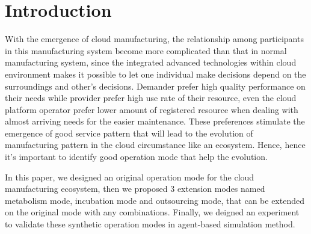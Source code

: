 \section{Introduction}
With the emergence of cloud manufacturing, the relationship among participants in this manufacturing system become more complicated than that in normal manufacturing system, since the integrated advanced technologies within cloud environment makes it possible to let one individual make decisions depend on the surroundings and other's decisions. Demander prefer high quality performance on their needs while provider prefer high use rate of their resource, even the cloud platform operator prefer lower amount of registered resource when dealing with almost arriving needs for the easier maintenance. These preferences stimulate the emergence of good service pattern that will lead to the evolution of manufacturing pattern in the cloud circumstance like an ecosystem. Hence, hence it's important to identify good operation mode that help the evolution. 

In this paper, we designed an original operation mode for the cloud manufacturing ecosystem, then we proposed 3 extension modes named metabolism mode, incubation mode and outsourcing mode, that can be extended on the original mode with any combinations. Finally, we deigned an experiment to validate these synthetic operation modes in agent-based simulation method.